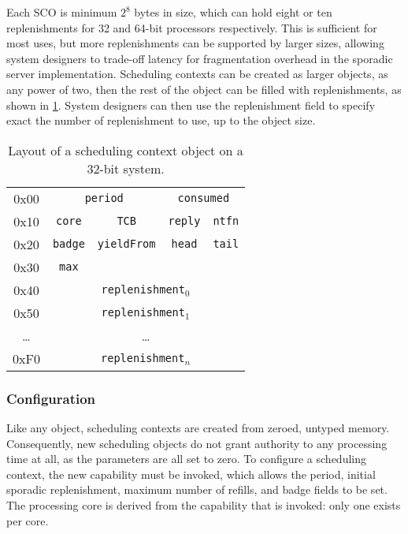 Each \gls{SCO} is minimum $2^{8}$ bytes in size, which can hold eight or ten replenishments for 32
and 64-bit processors respectively. This is sufficient for most uses, but more replenishments can
be supported by larger sizes, allowing system designers to trade-off latency for fragmentation
overhead in the sporadic server implementation. Scheduling contexts can be created as larger
objects, as any power of two, then the rest of the object can be filled with replenishments, as
shown in \cref{t:impl-sc-layout}. System designers can then use the  replenishment field
to specify exact the number of replenishment to use, up to the object size. 

\begin{table}[t] 
    \centering
    \begin{tabular}{c|c|c|c|c|}\cline{2-5}
        0x00 &  \multicolumn{2}{c}{\texttt{period}} & \multicolumn{2}{|c|}{\texttt{consumed}}
        \\\cline{2-5}
        0x10 & \texttt{core}                         & \texttt{TCB} & \texttt{reply} & \texttt{ntfn} \\\cline{2-5}
        0x20 &\texttt{badge}                        & \texttt{yieldFrom}                               & \texttt{head}  & \texttt{tail} \\\cline{2-5}
        0x30 & \texttt{max}                          &                                                  &                & \\\cline{2-5}
        0x40 & \multicolumn{4}{c|}{\texttt{replenishment$_{0}$}}  \\\cline{2-5}
        0x50 & \multicolumn{4}{c|}{\texttt{replenishment$_{1}$}}  \\\cline{2-5}
        \ldots & \multicolumn{4}{c|}{\ldots}  \\\cline{2-5}
        0xF0 & \multicolumn{4}{c|}{\texttt{replenishment$_{n}$}}  \\\cline{2-5}


    \end{tabular}
    \caption{Layout of a scheduling context object on a 32-bit system.}
    \label{t:impl-sc-layout}
\end{table}

\subsubsection{Configuration}

Like any \selfour object, scheduling contexts are created from zeroed, untyped memory. Consequently,
new scheduling objects do not grant authority to any processing time at all, as the parameters are
all set to zero. To configure a scheduling context, the new  capability must be
invoked, which allows the period, initial sporadic replenishment, maximum number of refills, and
badge fields to be set. The processing core is derived from the  capability
that is invoked: only one exists per core. 

